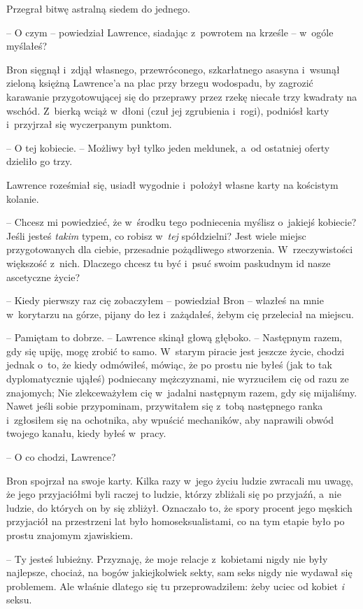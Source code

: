 \documentclass[oneside,polish,11pt,rmheadings]{mwbk}
\begin{document}
Przegrał bitwę astralną siedem do jednego. 

-- O czym -- powiedział Lawrence, siadając z~powrotem na krześle -- w~ogóle myślałeś? 

Bron sięgnął i~zdjął własnego, przewróconego, szkarłatnego asasyna i~wsunął zieloną księżną Lawrence'a na plac przy brzegu wodospadu, by zagrozić karawanie przygotowującej się do przeprawy przez rzekę niecałe trzy kwadraty na wschód. Z~bierką wciąż w~dłoni (czuł jej zgrubienia i~rogi), podniósł karty i~przyjrzał się wyczerpanym punktom.  

-- O tej kobiecie. -- Możliwy był tylko jeden meldunek, a~od ostatniej oferty dzieliło go trzy. 

Lawrence roześmiał się, usiadł wygodnie i~położył własne karty na kościstym kolanie. 

-- Chcesz mi powiedzieć, że w~środku tego podniecenia myślisz o~jakiejś kobiecie? Jeśli jesteś \textit{takim} typem, co robisz w~\textit{tej }spółdzielni? Jest wiele miejsc przygotowanych dla ciebie, przesadnie pożądliwego stworzenia. W~rzeczywistości większość z~nich. Dlaczego chcesz tu być i~psuć swoim paskudnym id nasze ascetyczne życie? 

-- Kiedy pierwszy raz cię zobaczyłem -- powiedział Bron -- wlazłeś na mnie w~korytarzu na górze, pijany do łez i~zażądałeś, żebym cię przeleciał na miejscu.  

-- Pamiętam to dobrze. -- Lawrence skinął głową głęboko. -- Następnym razem, gdy się upiję, mogę zrobić to samo. W~starym piracie jest jeszcze życie, chodzi jednak o~to, że kiedy odmówiłeś, mówiąc, że po prostu nie byłeś (jak to tak dyplomatycznie ująłeś) podniecany mężczyznami, nie wyrzuciłem cię od razu ze znajomych; Nie zlekceważyłem cię w~jadalni następnym razem, gdy się mijaliśmy. Nawet jeśli sobie przypominam, przywitałem się z~tobą następnego ranka i~zgłosiłem się na ochotnika, aby wpuścić mechaników, aby naprawili obwód twojego kanału, kiedy byłeś w~pracy. 

-- O co chodzi, Lawrence? 

Bron spojrzał na swoje karty. Kilka razy w~jego życiu ludzie zwracali mu uwagę, że jego przyjaciółmi byli raczej to ludzie, którzy zbliżali się po przyjaźń, a~nie ludzie, do których on by się zbliżył. Oznaczało to, że spory procent jego męskich przyjaciół na przestrzeni lat było homoseksualistami, co na tym etapie było po prostu znajomym zjawiskiem.  

-- Ty jesteś lubieżny. Przyznaję, że moje relacje z~kobietami nigdy nie były najlepsze, chociaż, na bogów jakiejkolwiek sekty, sam seks nigdy nie wydawał się problemem. Ale właśnie dlatego się tu przeprowadziłem: żeby uciec od kobiet \textit{i }seksu. 
\end{document}

